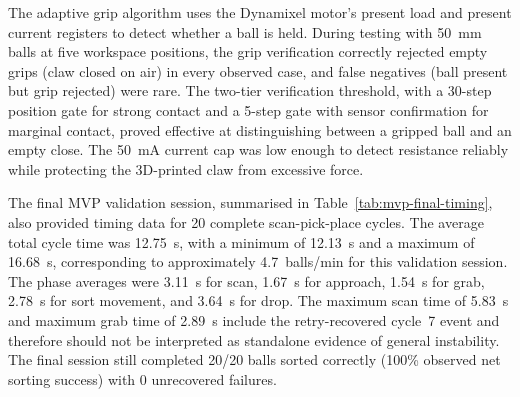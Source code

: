 The adaptive grip algorithm uses the Dynamixel motor's present
load and present current registers to detect whether a ball is
held. During testing with 50~mm balls at five workspace
positions, the grip verification correctly rejected empty grips
(claw closed on air) in every observed case, and false
negatives (ball present but grip rejected) were rare. The
two-tier verification threshold, with a 30-step position gate
for strong contact and a 5-step gate with sensor confirmation
for marginal contact, proved effective at distinguishing
between a gripped ball and an empty close. The 50~mA current
cap was low enough to detect resistance reliably while
protecting the 3D-printed claw from excessive force.


The final MVP validation session, summarised in
Table~\ref{tab:mvp-final-timing}, also provided timing data for
20 complete scan-pick-place cycles. The average total cycle time
was 12.75~s, with a minimum of 12.13~s and a maximum of 16.68~s,
corresponding to approximately 4.7~balls/min for this validation
session. The phase averages were 3.11~s for scan, 1.67~s for
approach, 1.54~s for grab, 2.78~s for sort movement, and 3.64~s
for drop. The maximum scan time of 5.83~s and maximum grab time
of 2.89~s include the retry-recovered cycle~7 event and therefore
should not be interpreted as standalone evidence of general
instability. The final session still completed 20/20 balls sorted
correctly (100\% observed net sorting success) with 0 unrecovered
failures.

